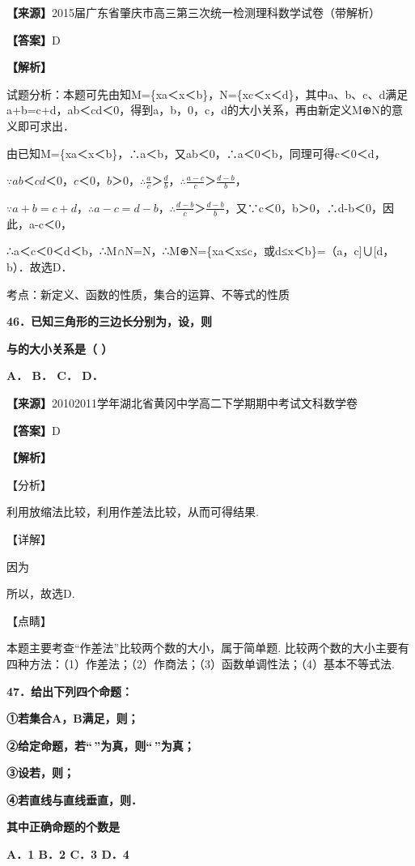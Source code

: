 \documentclass[
]{article}
\begin{document}
\textbf{【来源】}2015届广东省肇庆市高三第三次统一检测理科数学试卷（带解析）

\textbf{【答案】}D

\textbf{【解析】}

试题分析：本题可先由知M=\{x\textbar a＜x＜b\}，N=\{x\textbar c＜x＜d\}，其中a、b、c、d满足a+b=c+d，ab＜cd＜0，得到a，b，0，c，d的大小关系，再由新定义M⊕N的意义即可求出．

由已知M=\{x\textbar a＜x＜b\}，∴a＜b，又ab＜0，∴a＜0＜b，同理可得c＜0＜d，

\(\because ab＜cd＜0，c＜0，b＞0，\therefore\frac{a}{c}＞\frac{d}{b}，\therefore\frac{a - c}{c}＞\frac{d - b}{b}，\)

\(\because a + b = c + d，\therefore a - c = d - b，\therefore\frac{d - b}{c}＞\frac{d - b}{b}，\)又∵c＜0，b＞0，∴d-b＜0，因此，a-c＜0，

∴a＜c＜0＜d＜b，∴M∩N=N，∴M⊕N=\{x\textbar a＜x≤c，或d≤x＜b\}=（a，c{]}∪{[}d，b）．故选D．

考点：新定义、函数的性质，集合的运算、不等式的性质

\textbf{46．已知三角形的三边长分别为，设，则}

\textbf{与的大小关系是（ ）}

\textbf{A． B． C． D．}

\textbf{【来源】}20102011学年湖北省黄冈中学高二下学期期中考试文科数学卷

\textbf{【答案】}D

\textbf{【解析】}

【分析】

利用放缩法比较，利用作差法比较，从而可得结果.

【详解】

因为

所以，故选D.

【点睛】

本题主要考查``作差法''比较两个数的大小，属于简单题.
比较两个数的大小主要有四种方法：（1）作差法；（2）作商法；（3）函数单调性法；（4）基本不等式法.

\textbf{47．给出下列四个命题：}

\textbf{①若集合A，B满足，则；}

\textbf{②给定命题，若``\,''为真，则``\,''为真；}

\textbf{③设若，则；}

\textbf{④若直线与直线垂直，则．}

\textbf{其中正确命题的个数是}

\textbf{A．1 B．2 C．3 D．4}
\end{document}
